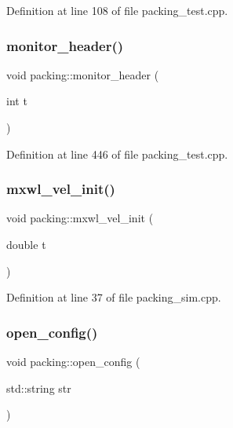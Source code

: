 Definition at line 108 of file packing\+\_\+test.\+cpp.

\mbox{\label{classpacking_a5567ef97dc24a25a5466dcbd8af82737}} 
\subsubsection{\texorpdfstring{monitor\+\_\+header()}{monitor\_header()}}
{\footnotesize\ttfamily void packing\+::monitor\+\_\+header (\begin{DoxyParamCaption}\item[{int}]{t }\end{DoxyParamCaption})}



Definition at line 446 of file packing\+\_\+test.\+cpp.

\mbox{\label{classpacking_ad096a61ae3cd07d3a85f0c865ec0af70}} 
\subsubsection{\texorpdfstring{mxwl\+\_\+vel\+\_\+init()}{mxwl\_vel\_init()}}
{\footnotesize\ttfamily void packing\+::mxwl\+\_\+vel\+\_\+init (\begin{DoxyParamCaption}\item[{double}]{t }\end{DoxyParamCaption})}



Definition at line 37 of file packing\+\_\+sim.\+cpp.

\mbox{\label{classpacking_a0c981ac48ac009de032b346acd442527}} 
\subsubsection{\texorpdfstring{open\+\_\+config()}{open\_config()}}
{\footnotesize\ttfamily void packing\+::open\+\_\+config (\begin{DoxyParamCaption}\item[{std\+::string}]{str }\end{DoxyParamCaption})\hspace{0.3cm}{\ttfamily [inline]}}




